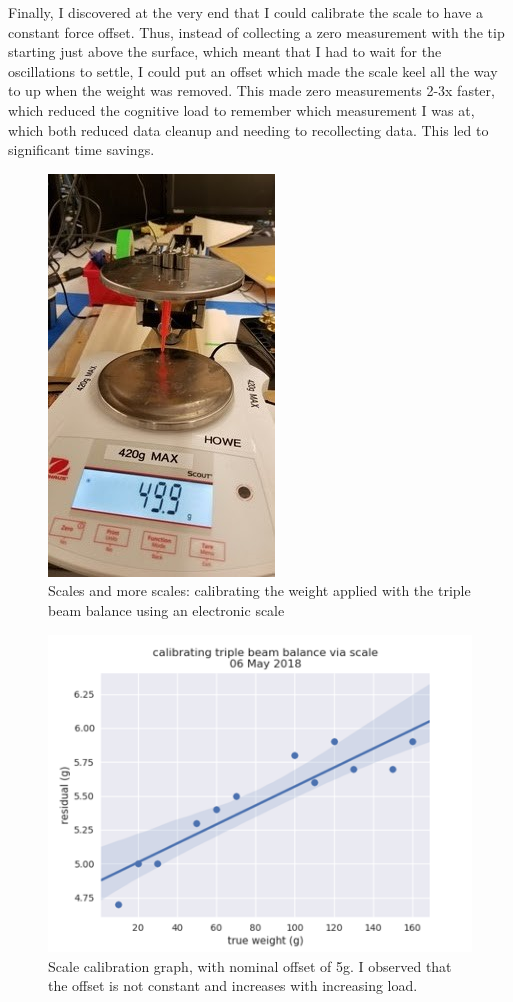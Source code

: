 \documentclass[12pt]{article}
\begin{document}
Finally, I discovered at the very end that I could calibrate the scale to have a constant force
offset. Thus, instead of collecting a zero measurement with the tip starting just above the surface,
which meant that I had to wait for the oscillations to settle, I could put an offset which made the
scale keel all the way to up when the weight was removed. This made zero measurements 2-3x
faster, which reduced the cognitive load to remember which measurement I was at, which both reduced
data cleanup and needing to recollecting data. This led to significant time savings.

\begin{figure}[H]
\centering
\includegraphics[width=.3\textheight]{images/setup/scale_calibration.jpg}
\caption{Scales and more scales: calibrating the weight applied with the triple beam balance using an electronic scale }
\end{figure}


\begin{figure}[H]
\centering
\includegraphics[width=.9\textwidth]{images/setup/scale_calibration_graph.png}
\caption{Scale calibration graph, with nominal offset of 5g. I observed that the offset is not
constant and increases with increasing load.}
\end{figure}
\end{document}
